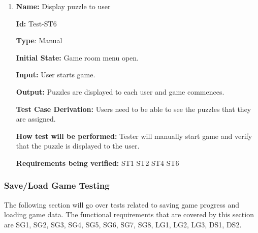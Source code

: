 \documentclass[12pt, titlepage]{article}
\begin{document}
\begin{enumerate}
\item{\textbf{Name:} Display puzzle to user}

\textbf{Id:} Test-ST6

\textbf{Type}: Manual

\textbf{Initial State:} Game room menu open.

\textbf{Input:} User starts game.

\textbf{Output:} Puzzles are displayed to each user and game commences.

\textbf{Test Case Derivation:} Users need to be able to see the puzzles that they are assigned.

\textbf{How test will be performed:} Tester will manually start game and verify that the puzzle is displayed to the user.

\textbf{Requirements being verified: } ST1 ST2 ST4 ST6

\end{enumerate}

\subsubsection{Save/Load Game Testing}
The following section will go over tests related to saving game progress and loading game data. The functional requirements that are covered by this section are SG1, SG2, SG3, SG4, SG5, SG6, SG7, SG8, LG1, LG2, LG3, DS1, DS2.
\end{document}
